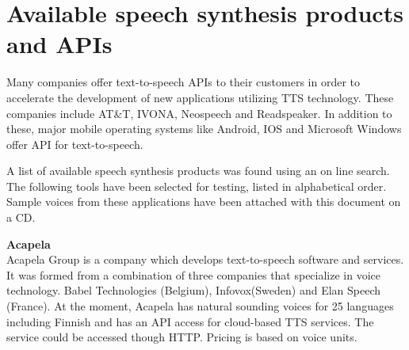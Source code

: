 \documentclass[11pt,a4paper,oneside,article]{memoir}
\begin{document}
\section{Available speech synthesis products and APIs}
Many companies offer text-to-speech APIs to their customers in order to accelerate the development of new applications utilizing TTS technology. These companies include AT\&T, IVONA, Neospeech and Readspeaker. In addition to these, major mobile operating systems like Android, IOS and Microsoft Windows offer API for text-to-speech. 


%



A list of available speech synthesis products was found using an on line search. The following tools have been selected for testing, listed in alphabetical order. Sample voices from these applications have been attached with this document on a CD. 

\textbf{Acapela}\\
Acapela Group is a company which develops text-to-speech software and services. It was formed from a combination of three companies that specialize in voice technology. Babel Technologies (Belgium), Infovox(Sweden) and Elan Speech (France). At the moment, Acapela has natural sounding voices for 25 languages including Finnish and has an API access for cloud-based TTS services. The service could be accessed though HTTP. Pricing is based on voice units. \cite{acapela}
\end{document}

